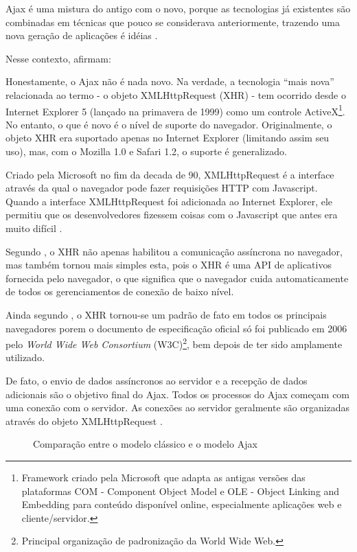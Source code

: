 Ajax é uma mistura do antigo com o novo, porque as tecnologias já existentes são combinadas em técnicas que pouco se considerava anteriormente, trazendo uma nova geração de aplicações é idéias \cite{gross2006introduction}.

Nesse contexto,  afirmam:
\begin{citacao}
	Honestamente, o Ajax não é nada novo. Na verdade, a tecnologia “mais nova” relacionada ao termo - o objeto XMLHttpRequest (XHR) - tem ocorrido desde o Internet Explorer 5 (lançado na primavera de 1999) como um controle ActiveX\footnote{Framework criado pela Microsoft que adapta as antigas versões das plataformas COM - Component Object Model e OLE - Object Linking and Embedding para conteúdo disponível online, especialmente aplicações web e cliente/servidor.}. No entanto, o que é novo é o nível de suporte do navegador. Originalmente, o objeto XHR era suportado apenas no Internet Explorer (limitando assim seu uso), mas, com o Mozilla 1.0 e Safari 1.2, o suporte é generalizado.
\end{citacao}

Criado pela Microsoft no fim da decada de 90, XMLHttpRequest é a interface através da qual o navegador pode fazer requisições HTTP com Javascript. Quando a interface XMLHttpRequest foi adicionada ao Internet Explorer, ele permitiu que os desenvolvedores fizessem coisas com o Javascript que antes era muito difícil \cite{haverbeke2014eloquent}.

Segundo , o XHR não apenas habilitou a comunicação assíncrona no navegador, mas também tornou mais simples esta, pois o XHR é uma API de aplicativos fornecida pelo navegador, o que significa que o navegador cuida automaticamente de todos os gerenciamentos de conexão de baixo nível.

Ainda segundo , o XHR tornou-se um padrão de fato em todos os principais navegadores porem o documento de especificação oficial só foi publicado em 2006 pelo \emph{World Wide Web Consortium} (W3C)\footnote{Principal organização de padronização da World Wide Web.}, bem depois de ter sido amplamente utilizado.

De fato, o envio de dados assíncronos ao servidor e a recepção de dados adicionais são o objetivo final do Ajax. Todos os processos do Ajax começam com uma conexão com o servidor. As conexões ao servidor geralmente são organizadas através do objeto XMLHttpRequest \cite{resig2007pro}.

\begin{figure}[!htb]
	\centering
	\hfill
	\caption{Comparação entre o modelo clássico e o modelo Ajax}
	\label{defaultVsAjax}
\end{figure}


